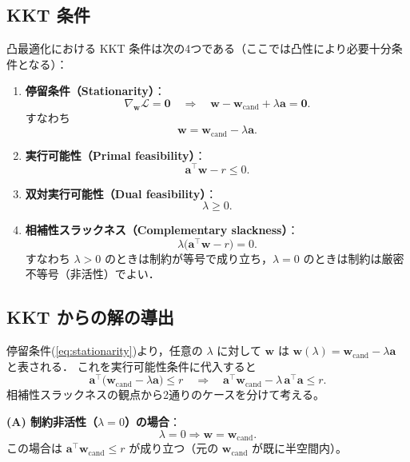 \documentclass[uplatex]{jsarticle}
\begin{document}
\subsection{KKT 条件}
凸最適化における KKT 条件は次の4つである（ここでは凸性により必要十分条件となる）：

\begin{enumerate}
 \item \textbf{停留条件（Stationarity）}：
       \[
         \nabla_{\boldsymbol{w}}\mathcal{L} = \boldsymbol{0}
         \quad\Longrightarrow\quad
         \boldsymbol{w} - \boldsymbol{w}_{\mathrm{cand}} + \lambda \boldsymbol{a} = \boldsymbol{0}.
       \]
       すなわち
       \begin{equation}\label{eq:stationarity}
         \boldsymbol{w} = \boldsymbol{w}_{\mathrm{cand}} - \lambda \boldsymbol{a}.
       \end{equation}

 \item \textbf{実行可能性（Primal feasibility）}：
       \[
         \boldsymbol{a}^\top\boldsymbol{w} - r \le 0.
       \]

 \item \textbf{双対実行可能性（Dual feasibility）}：
       \[
         \lambda \ge 0.
       \]

 \item \textbf{相補性スラックネス（Complementary slackness）}：
       \[
         \lambda\big(\boldsymbol{a}^\top\boldsymbol{w} - r\big) = 0.
       \]
       すなわち \(\lambda>0\) のときは制約が等号で成り立ち，\(\lambda=0\) のときは制約は厳密不等号（非活性）でよい．
\end{enumerate}

\subsection{KKT からの解の導出}
停留条件(\ref{eq:stationarity})より，任意の \(\lambda\) に対して \(\boldsymbol{w}\) は
\(\boldsymbol{w}(\lambda)=\boldsymbol{w}_{\mathrm{cand}}-\lambda\boldsymbol{a}\) と表される．
これを実行可能性条件に代入すると
\[
\boldsymbol{a}^\top\big(\boldsymbol{w}_{\mathrm{cand}} - \lambda\boldsymbol{a}\big) \le r
\quad\Longrightarrow\quad
\boldsymbol{a}^\top\boldsymbol{w}_{\mathrm{cand}} - \lambda \,\boldsymbol{a}^\top\boldsymbol{a} \le r.
\]
相補性スラックネスの観点から2通りのケースを分けて考える。

\medskip\noindent
\textbf{(A) 制約非活性（\(\lambda=0\)）の場合}：
\[
\lambda=0 \Rightarrow \boldsymbol{w}=\boldsymbol{w}_{\mathrm{cand}}.
\]
この場合は \(\boldsymbol{a}^\top\boldsymbol{w}_{\mathrm{cand}}\le r\) が成り立つ（元の $\boldsymbol{w}_{\mathrm{cand}}$ が既に半空間内）。
\end{document}

